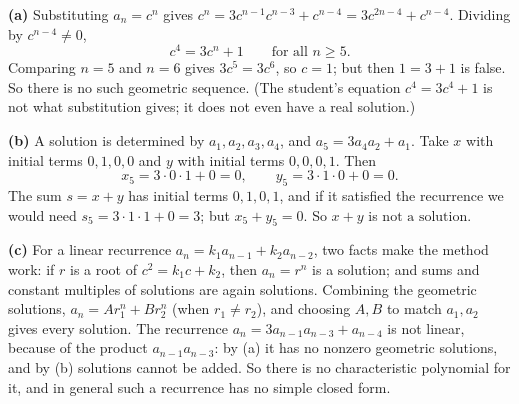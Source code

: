 \textbf{(a)} Substituting $a_n=c^n$ gives $c^n=3c^{n-1}c^{n-3}+c^{n-4}=3c^{2n-4}+c^{n-4}$. Dividing by $c^{n-4}\ne0$,
\[c^4=3c^n+1\qquad\text{for all }n\ge5.\]
Comparing $n=5$ and $n=6$ gives $3c^5=3c^6$, so $c=1$; but then $1=3+1$ is false. So there is no such geometric sequence. (The student's equation $c^4=3c^4+1$ is not what substitution gives; it does not even have a real solution.)

\textbf{(b)} A solution is determined by $a_1,a_2,a_3,a_4$, and $a_5=3a_4a_2+a_1$. Take $x$ with initial terms $0,1,0,0$ and $y$ with initial terms $0,0,0,1$. Then
\[x_5=3\cdot0\cdot1+0=0,\qquad y_5=3\cdot1\cdot0+0=0.\]
The sum $s=x+y$ has initial terms $0,1,0,1$, and if it satisfied the recurrence we would need $s_5=3\cdot1\cdot1+0=3$; but $x_5+y_5=0$. So $x+y$ is $\boxed{\text{not a solution}}$.

\textbf{(c)} For a linear recurrence $a_n=k_1a_{n-1}+k_2a_{n-2}$, two facts make the method work: if $r$ is a root of $c^2=k_1c+k_2$, then $a_n=r^n$ is a solution; and sums and constant multiples of solutions are again solutions. Combining the geometric solutions, $a_n=Ar_1^n+Br_2^n$ (when $r_1\ne r_2$), and choosing $A,B$ to match $a_1,a_2$ gives every solution. The recurrence $a_n=3a_{n-1}a_{n-3}+a_{n-4}$ is not linear, because of the product $a_{n-1}a_{n-3}$: by (a) it has no nonzero geometric solutions, and by (b) solutions cannot be added. So there is no characteristic polynomial for it, and in general such a recurrence has no simple closed form.
